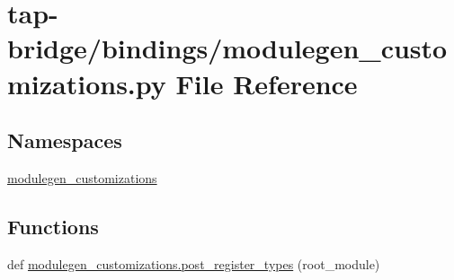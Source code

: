 \hypertarget{tap-bridge_2bindings_2modulegen__customizations_8py}{}\section{tap-\/bridge/bindings/modulegen\+\_\+customizations.py File Reference}
\label{tap-bridge_2bindings_2modulegen__customizations_8py}
\subsection*{Namespaces}
\begin{DoxyCompactItemize}
\item 
 \hyperlink{namespacemodulegen__customizations}{modulegen\+\_\+customizations}
\end{DoxyCompactItemize}
\subsection*{Functions}
\begin{DoxyCompactItemize}
\item 
def \hyperlink{namespacemodulegen__customizations_a752cb066e8de8ee88028481335101ec9}{modulegen\+\_\+customizations.\+post\+\_\+register\+\_\+types} (root\+\_\+module)
\end{DoxyCompactItemize}

